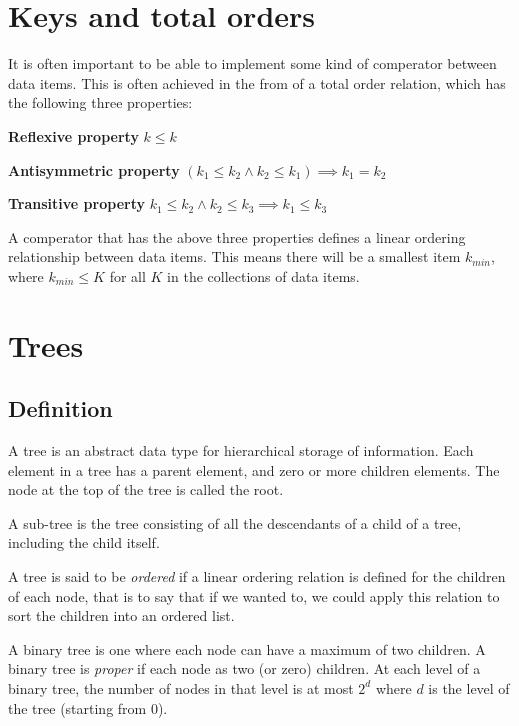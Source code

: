 
\section{Keys and total orders}

It is often important to be able to implement some kind of comperator between
data items. This is often achieved in the from of a total order relation, which
has the following three properties:

\begin{description}
  \item \textbf{Reflexive property} 
    $k \leq k$
  \item \textbf{Antisymmetric property}
    $(k_1 \leq k_2 \wedge k_2 \leq k_1) \implies k_1 = k_2$
  \item \textbf{Transitive property} 
    $k_1 \leq k_2 \wedge k_2 \leq k_3 \implies k_1 \leq k_3$
\end{description}

A comperator that has the above three properties defines a linear ordering
relationship between data items. This means there will be a smallest item
$k_{min}$, where $k_{min} \leq K$ for all $K$ in the collections of data items.

\section{Trees}

\subsection{Definition}

A tree is an abstract data type for hierarchical storage of information. Each
element in a tree has a parent element, and zero or more children elements. The
node at the top of the tree is called the root.

A sub-tree is the tree consisting of all the descendants of a child of a tree,
including the child itself.

A tree is said to be \textit{ordered} if a linear ordering relation is defined
for the children of each node, that is to say that if we wanted to, we could
apply this relation to sort the children into an ordered list.

A binary tree is one where each node can have a maximum of two children. A
binary tree is \textit{proper} if each node as two (or zero) children. At each
level of a binary tree, the number of nodes in that level is at most $2^d$ where
$d$ is the level of the tree (starting from 0).


